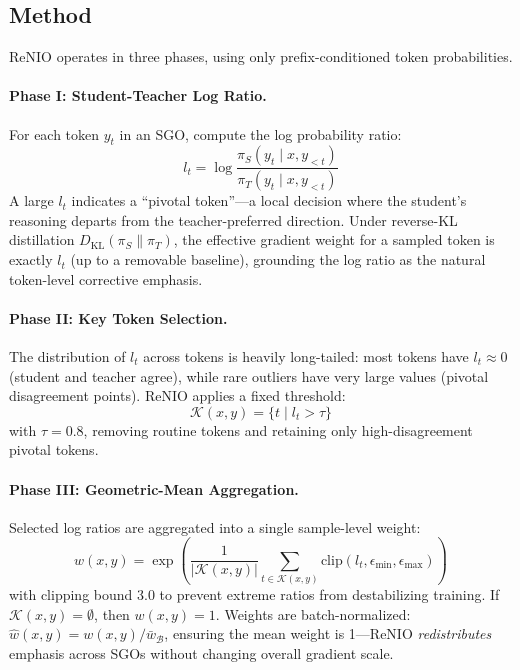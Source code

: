 \documentclass[11pt,a4paper]{article}
\begin{document}
\subsection{Method}

ReNIO operates in three phases, using only prefix-conditioned token probabilities.

\paragraph{Phase I: Student-Teacher Log Ratio.} For each token $y_t$ in an SGO, compute the log probability ratio:
\begin{equation}
l_t = \log \frac{\pi_S(y_t \mid x, y_{<t})}{\pi_T(y_t \mid x, y_{<t})}
\end{equation}
A large $l_t$ indicates a ``pivotal token''---a local decision where the student's reasoning departs from the teacher-preferred direction. Under reverse-KL distillation $D_{\mathrm{KL}}(\pi_S \| \pi_T)$, the effective gradient weight for a sampled token is exactly $l_t$ (up to a removable baseline), grounding the log ratio as the natural token-level corrective emphasis.

\paragraph{Phase II: Key Token Selection.} The distribution of $l_t$ across tokens is heavily long-tailed: most tokens have $l_t \approx 0$ (student and teacher agree), while rare outliers have very large values (pivotal disagreement points). ReNIO applies a fixed threshold:
\begin{equation}
\mathcal{K}(x, y) = \{t \mid l_t > \tau\}
\end{equation}
with $\tau = 0.8$, removing routine tokens and retaining only high-disagreement pivotal tokens.

\paragraph{Phase III: Geometric-Mean Aggregation.} Selected log ratios are aggregated into a single sample-level weight:
\begin{equation}
w(x, y) = \exp\!\left(\frac{1}{|\mathcal{K}(x,y)|} \sum_{t \in \mathcal{K}(x,y)} \mathrm{clip}(l_t, \epsilon_{\min}, \epsilon_{\max})\right)
\end{equation}
with clipping bound 3.0 to prevent extreme ratios from destabilizing training. If $\mathcal{K}(x,y) = \emptyset$, then $w(x,y) = 1$. Weights are batch-normalized: $\hat{w}(x,y) = w(x,y) / \bar{w}_\mathcal{B}$, ensuring the mean weight is 1---ReNIO \emph{redistributes} emphasis across SGOs without changing overall gradient scale.
\end{document}
